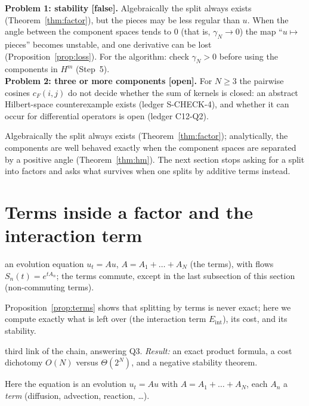 \documentclass[11pt,a4paper]{article}
\theoremstyle{definition}
\newcommand{\badge}[2]{\textcolor{#1}{\textsf{\footnotesize[#2]}}}
\newcommand{\openq}{\badge{cB}{open}}
\newcommand{\falsest}{\badge{cB}{false}}
\newcommand{\led}[1]{\textcolor{cG}{\textsf{\footnotesize(ledger #1)}}}
\newcommand{\sectionbrief}[3]{\begin{leadin}\begin{description}[nosep,leftmargin=3.0cm,labelwidth=2.8cm]
  \item[Starting from] #1
  \item[Why this section] #2
  \item[Role in the paper] #3
  \end{description}\end{leadin}}
\newcommand{\Eint}{E_{\mathrm{int}}}
\begin{document}
\begin{caution}[title=Two problems with regularity]
\textbf{Problem 1: stability \falsest.} Algebraically the split always exists (Theorem~\ref{thm:factor}), but the pieces may be less regular than $u$. When the angle between the component spaces tends to $0$ (that is, $\gamma_N\to0$) the map ``$u\mapsto$ pieces'' becomes unstable, and one derivative can be lost (Proposition~\ref{prop:loss}). For the algorithm: check $\gamma_N>0$ before using the components in $H^m$ (Step~5).\\[3pt]
\textbf{Problem 2: three or more components \openq.} For $N\ge3$ the pairwise cosines $c_F(i,j)$ do not decide whether the sum of kernels is closed: an abstract Hilbert-space counterexample exists \led{S-CHECK-4}, and whether it can occur for differential operators is open \led{C12-Q2}.
\end{caution}



\begin{takeaway}
Algebraically the split always exists (Theorem~\ref{thm:factor}); analytically, the components are well behaved exactly when the component spaces are separated by a positive angle (Theorem~\ref{thm:hm}). The next section stops asking for a split into factors and asks what survives when one splits by additive terms instead.
\end{takeaway}

\section{Terms inside a factor and the interaction term}\label{sec:terms}
\sectionbrief
{an evolution equation $u_t=Au$, $A=A_1+\dots+A_N$ (the terms), with flows $S_n(t)=e^{tA_n}$; the terms commute, except in the last subsection of this section (non-commuting terms).}
{Proposition~\ref{prop:terms} shows that splitting by terms is never exact; here we compute exactly what is left over (the interaction term $\Eint$), its cost, and its stability.}
{third link of the chain, answering Q3. \emph{Result:} an exact product formula, a cost dichotomy $O(N)$ versus $\Theta(2^N)$, and a negative stability theorem.}

Here the equation is an evolution $u_t=Au$ with $A=A_1+\dots+A_N$, each $A_n$ a \emph{term} (diffusion, advection, reaction, \dots).
\end{document}
